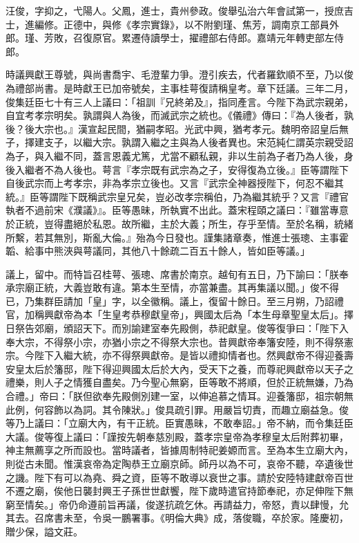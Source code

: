 \begin{pinyinscope}
汪俊，字抑之，弋陽人。父鳳，進士，貴州參政。俊舉弘治六年會試第一，授庶吉士，進編修。正德中，與修《孝宗實錄》，以不附劉瑾、焦芳，調南京工部員外郎。瑾、芳敗，召復原官。累遷侍讀學士，擢禮部右侍郎。嘉靖元年轉吏部左侍郎。

時議興獻王尊號，與尚書喬宇、毛澄輩力爭。澄引疾去，代者羅欽順不至，乃以俊為禮部尚書。是時獻王已加帝號矣，主事桂萼復請稱皇考。章下廷議。三年二月，俊集廷臣七十有三人上議曰：「祖訓『兄終弟及』，指同產言。今陛下為武宗親弟，自宜考孝宗明矣。孰謂與人為後，而滅武宗之統也。《儀禮》傳曰：『為人後者，孰後？後大宗也。』漢宣起民間，猶嗣孝昭。光武中興，猶考孝元。魏明帝詔皇后無子，擇建支子，以繼大宗。孰謂入繼之主與為人後者異也。宋范純仁謂英宗親受詔為子，與入繼不同，蓋言恩義尤篤，尤當不顧私親，非以生前為子者乃為人後，身後入繼者不為人後也。萼言『孝宗既有武宗為之子，安得復為立後。』臣等謂陛下自後武宗而上考孝宗，非為孝宗立後也。又言『武宗全神器授陛下，何忍不繼其統。』臣等謂陛下既稱武宗皇兄矣，豈必改孝宗稱伯，乃為繼其統乎？又言『禮官執者不過前宋《濮議》』。臣等愚昧，所執實不出此。蓋宋程頤之議曰：『雖當專意於正統，豈得盡絕於私恩。故所繼，主於大義；所生，存乎至情。至於名稱，統緒所繫，若其無別，斯亂大倫。』殆為今日發也。謹集諸章奏，惟進士張璁、主事霍韜、給事中熊浹與萼議同，其他八十餘疏二百五十餘人，皆如臣等議。」

議上，留中。而特旨召桂萼、張璁、席書於南京。越旬有五日，乃下諭曰：「朕奉承宗廟正統，大義豈敢有違。第本生至情，亦當兼盡。其再集議以聞。」俊不得已，乃集群臣請加「皇」字，以全徽稱。議上，復留十餘日。至三月朔，乃詔禮官，加稱興獻帝為本「生皇考恭穆獻皇帝」，興國太后為「本生母章聖皇太后」。擇日祭告郊廟，頒詔天下。而別諭建室奉先殿側，恭祀獻皇。俊等復爭曰：「陛下入奉大宗，不得祭小宗，亦猶小宗之不得祭大宗也。昔興獻帝奉籓安陸，則不得祭憲宗。今陛下入繼大統，亦不得祭興獻帝。是皆以禮抑情者也。然興獻帝不得迎養壽安皇太后於籓邸，陛下得迎興國太后於大內，受天下之養，而尊祀興獻帝以天子之禮樂，則人子之情獲自盡矣。乃今聖心無窮，臣等敢不將順，但於正統無嫌，乃為合禮。」帝曰：「朕但欲奉先殿側別建一室，以伸追慕之情耳。迎養籓邸，祖宗朝無此例，何容飾以為詞。其令陳狀。」俊具疏引罪。用嚴旨切責，而趣立廟益急。俊等乃上議曰：「立廟大內，有干正統。臣實愚昧，不敢奉詔。」帝不納，而令集廷臣大議。俊等復上議曰：「謹按先朝奉慈別殿，蓋孝宗皇帝為孝穆皇太后附葬初畢，神主無薦享之所而設也。當時議者，皆據周制特祀姜嫄而言。至為本生立廟大內，則從古未聞。惟漢哀帝為定陶恭王立廟京師。師丹以為不可，哀帝不聽，卒遺後世之譏。陛下有可以為堯、舜之資，臣等不敢導以衰世之事。請於安陸特建獻帝百世不遷之廟，俟他日襲封興王子孫世世獻饗，陛下歲時遣官持節奉祀，亦足伸陛下無窮至情矣。」帝仍命遵前旨再議，俊遂抗疏乞休。再請益力，帝怒，責以肆慢，允其去。召席書未至，令吳一鵬署事。《明倫大典》成，落俊職，卒於家。隆慶初，贈少保，謚文莊。


\end{pinyinscope}
